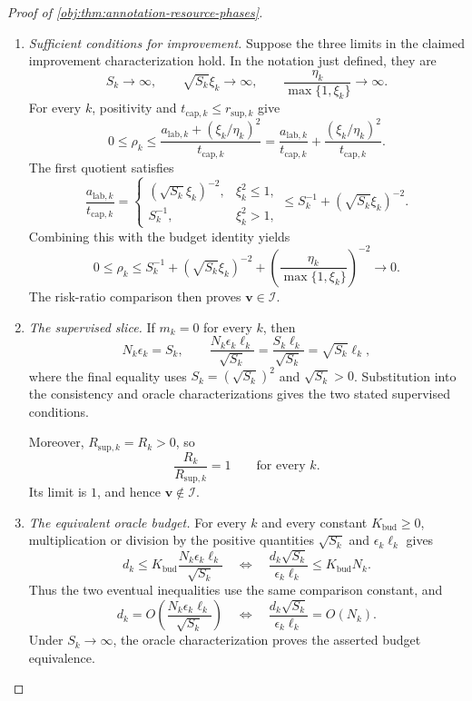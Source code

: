 \begin{proof}[Proof of \cref{obj:thm:annotation-resource-phases}]
\begin{enumerate}
\item \emph{Sufficient conditions for improvement.}
Suppose the three limits in the claimed improvement characterization hold. In the notation just defined, they are
\[
S_k\longrightarrow\infty,\qquad
\sqrt{S_k}\xi_k\longrightarrow\infty,\qquad
\frac{\eta_k}{\max\{1,\xi_k\}}\longrightarrow\infty.
\]
For every \(k\), positivity and
\(t_{\mathrm{cap},k}\le r_{\mathrm{sup},k}\) give
\[
0\le\rho_k
\le
\frac{a_{\mathrm{lab},k}+(\xi_k/\eta_k)^2}
     {t_{\mathrm{cap},k}}
=
\frac{a_{\mathrm{lab},k}}{t_{\mathrm{cap},k}}
+
\frac{(\xi_k/\eta_k)^2}{t_{\mathrm{cap},k}}.
\]
The first quotient satisfies
\[
\frac{a_{\mathrm{lab},k}}{t_{\mathrm{cap},k}}
=
\begin{cases}
(\sqrt{S_k}\xi_k)^{-2},&\xi_k^2\le1,\\
S_k^{-1},&\xi_k^2>1,
\end{cases}
\le S_k^{-1}+(\sqrt{S_k}\xi_k)^{-2}.
\]
Combining this with the budget identity yields
\[
0\le\rho_k
\le
S_k^{-1}
+(\sqrt{S_k}\xi_k)^{-2}
+\left(\frac{\eta_k}{\max\{1,\xi_k\}}\right)^{-2}
\longrightarrow0.
\]
The risk-ratio comparison then proves
\(\mathbf v\in\mathcal I\).

\item \emph{The supervised slice.}
If \(m_k=0\) for every \(k\), then
\[
N_k\epsilon_k=S_k,\qquad
\frac{N_k\epsilon_k\ell_k}{\sqrt{S_k}}
=\frac{S_k\ell_k}{\sqrt{S_k}}
=\sqrt{S_k}\ell_k,
\]
where the final equality uses \(S_k=(\sqrt{S_k})^2\) and
\(\sqrt{S_k}>0\). Substitution into the consistency and oracle characterizations gives the two stated supervised conditions.

Moreover, \(R_{\mathrm{sup},k}=R_k>0\), so
\[
\frac{R_k}{R_{\mathrm{sup},k}}=1
\qquad\text{for every }k.
\]
Its limit is \(1\), and hence \(\mathbf v\notin\mathcal I\).

\item \emph{The equivalent oracle budget.}
For every \(k\) and every constant \(K_{\mathrm{bud}}\ge0\), multiplication or division by the positive quantities
\(\sqrt{S_k}\) and \(\epsilon_k\ell_k\) gives
\[
d_k\le K_{\mathrm{bud}}
\frac{N_k\epsilon_k\ell_k}{\sqrt{S_k}}
\quad\Longleftrightarrow\quad
\frac{d_k\sqrt{S_k}}{\epsilon_k\ell_k}
\le K_{\mathrm{bud}}N_k.
\]
Thus the two eventual inequalities use the same comparison constant, and
\[
d_k=O\!\left(\frac{N_k\epsilon_k\ell_k}{\sqrt{S_k}}\right)
\quad\Longleftrightarrow\quad
\frac{d_k\sqrt{S_k}}{\epsilon_k\ell_k}=O(N_k).
\]
Under \(S_k\to\infty\), the oracle characterization proves the asserted budget equivalence.


\end{enumerate}
\end{proof}
